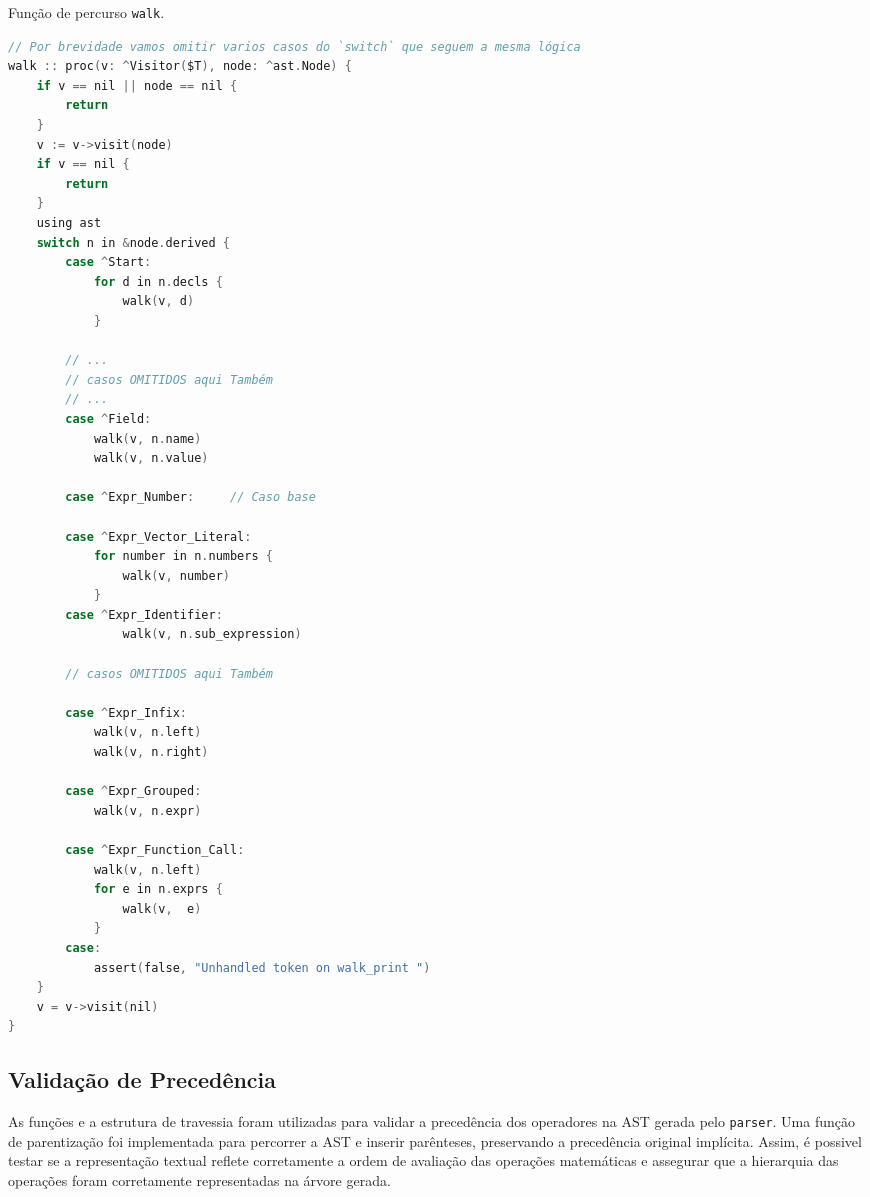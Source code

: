 \begin{codigo}[ht]
\caption{\small Função de percurso \texttt{walk}. }
        \label{cod-visitor-walk}
\begin{lstlisting}[language = C]
// Por brevidade vamos omitir varios casos do `switch` que seguem a mesma lógica
walk :: proc(v: ^Visitor($T), node: ^ast.Node) {
    if v == nil || node == nil {
        return
    }
    v := v->visit(node)
    if v == nil {
        return
    }
    using ast
    switch n in &node.derived {
        case ^Start:
            for d in n.decls {
                walk(v, d)
            }

        // ...
        // casos OMITIDOS aqui Também
        // ...
        case ^Field:
            walk(v, n.name)
            walk(v, n.value)

        case ^Expr_Number:     // Caso base

        case ^Expr_Vector_Literal:
            for number in n.numbers {
                walk(v, number)
            }
        case ^Expr_Identifier:
                walk(v, n.sub_expression)

        // casos OMITIDOS aqui Também

        case ^Expr_Infix:
            walk(v, n.left)
            walk(v, n.right)

        case ^Expr_Grouped:
            walk(v, n.expr)

        case ^Expr_Function_Call:
            walk(v, n.left)
            for e in n.exprs {
                walk(v,  e)
            }
        case:
            assert(false, "Unhandled token on walk_print ")
    }
    v = v->visit(nil)
}

  \end{lstlisting}
\end{codigo}


\subsection{Validação de Precedência}
As funções e a estrutura de travessia foram utilizadas para validar a precedência dos operadores na AST gerada pelo \texttt{parser}. Uma função de parentização foi implementada para percorrer a AST e inserir parênteses, preservando a precedência original implícita. Assim, é possivel testar se a representação textual reflete corretamente a ordem de avaliação das operações matemáticas e assegurar que a hierarquia das operações foram corretamente representadas na árvore gerada.

